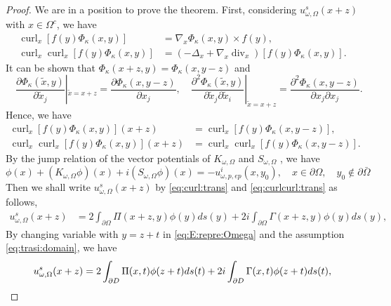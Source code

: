 \documentclass[a4paper,11pt]{article}
\theoremstyle{remark}
\theoremstyle{definition}
\numberwithin{equation}{section}
\DeclareMathOperator{\curl}{curl}
\DeclareMathOperator{\Div}{div}
\begin{document}
\begin{proof}
We are in a position to prove the theorem. First, considering $ u_{\omega,\Omega}^s(x+z)$ with $x\in \Omega^c$, we
  have
  \begin{align*}
  \curl_{x}[f(y)\Phi_{\kappa}(x,y)] &= \nabla_{x}\Phi_{\kappa}(x,y)\times f(y), \\
  \curl_{x} \curl_{x} [f(y)\Phi_{\kappa}(x,y)] & = (-\Delta_{x} + \nabla_{x} \Div_{x})[f(y)\Phi_{\kappa}(x,y)].
  \end{align*}
It can be shown that $ \Phi_{\kappa}(x+z,y) = \Phi_{\kappa}(x,y-z)$ and
  \[
  \quad \frac{\partial \Phi_{\kappa}(\tilde x,y)}{\partial \tilde x_{j}}|_{\tilde{x} = x+z} =   \frac{\partial \Phi_{\kappa}( x,y-z)}{\partial x_{j}},\quad   \frac{\partial^2 \Phi_{\kappa}(\tilde x,y)}{\partial \tilde x_{j}\partial \tilde x_{i}}|_{\tilde{x} = x+z} =   \frac{\partial^2 \Phi_{\kappa}( x,y-z)}{\partial x_{j}\partial x_{j}}.
  \]
Hence, we have
  \begin{equation}\label{eq:curlcurl:trans}
  \begin{aligned}
  \curl_{x}[f(y)\Phi_{\kappa}(x,y)](x+z) &=   \curl_{x}[f(y)\Phi_{\kappa}(x,y-z)], \\
  \curl_{x} \curl_{x} [f(y)\Phi_{\kappa}(x,y)](x+z) & = \curl_{x} \curl_{x} [f(y)\Phi_{\kappa}(x,y-z)] .
  \end{aligned}
\end{equation}
     By the jump relation of the vector potentials of $K_{\omega, \Omega}$ and $S_{\omega, \Omega}$ \cite{PH, PHhab}, we have
  \begin{equation}\label{eq:density:eq:Omega}
  \phi(x) + (K_{\omega,\Omega}\phi)(x) + i (S_{\omega,\Omega} \phi)(x) = -  u_{\omega, p,ep}^i(x,y_0), \quad x \in \partial \Omega, \quad y_0 \notin  \partial \bar \Omega
  \end{equation}
Then we shall write $  u_{\omega,\Omega}^s(x+z)$ by \eqref{eq:curl:trans} and \eqref{eq:curlcurl:trans} as follows,
  \begin{align}
  u_{\omega,\Omega}^s(x+z)
                           & =  2\int_{\partial \Omega}\Pi(x+z,y) \phi(y)ds(y) + 2i  \int_{\partial \Omega} \Gamma(x+z,y) \phi(y)ds(y),
     \label{eq:E:repre:Omega}
  \end{align}
   By changing variable with $y = z+t$ in \eqref{eq:E:repre:Omega} and the assumption \eqref{eq:trasi:domain}, we have
   \begin{align}
     u_{\omega,\Omega}^s(x+z)
      &=  2\int_{\partial D}\Pi(x,t) \phi(z+t)ds(t) + 2i  \int_{\partial D} \Gamma(x,t) \phi(z+t)ds(t), \notag \\

\end{align}
\end{proof}
\end{document}
